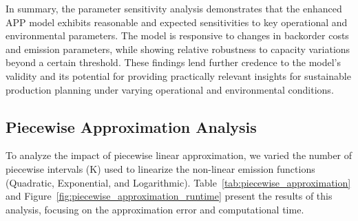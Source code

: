 \begin{table}[htbp]
\begin{table}[htbp]
\begin{table}[htbp]
\begin{table}[htbp]
In summary, the parameter sensitivity analysis demonstrates that the enhanced APP model exhibits reasonable and expected sensitivities to key operational and environmental parameters.  The model is responsive to changes in backorder costs and emission parameters, while showing relative robustness to capacity variations beyond a certain threshold.  These findings lend further credence to the model's validity and its potential for providing practically relevant insights for sustainable production planning under varying operational and environmental conditions.

\subsection{Piecewise Approximation Analysis}
\label{subsec:piecewise_approximation}
To analyze the impact of piecewise linear approximation, we varied the number of piecewise intervals (K) used to linearize the non-linear emission functions (Quadratic, Exponential, and Logarithmic). Table~\ref{tab:piecewise_approximation} and Figure~\ref{fig:piecewise_approximation_runtime} present the results of this analysis, focusing on the approximation error and computational time.


\end{table}
\end{table}
\end{table}
\end{table}
